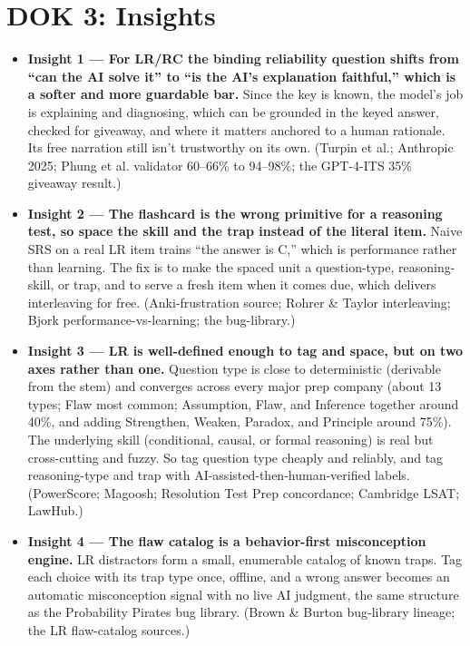 \documentclass[11pt]{article}
\begin{document}
\section*{DOK 3: Insights}

\begin{itemize}
\item \textbf{Insight 1 --- For LR/RC the binding reliability question shifts from \enquote{can the AI solve it} to \enquote{is the AI's explanation faithful,} which is a softer and more guardable bar.} Since the key is known, the model's job is explaining and diagnosing, which can be grounded in the keyed answer, checked for giveaway, and where it matters anchored to a human rationale. Its free narration still isn't trustworthy on its own. (Turpin et al.; Anthropic 2025; Phung et al. validator 60--66\% to 94--98\%; the GPT-4-ITS 35\% giveaway result.)
\item \textbf{Insight 2 --- The flashcard is the wrong primitive for a reasoning test, so space the skill and the trap instead of the literal item.} Naive SRS on a real LR item trains \enquote{the answer is C,} which is performance rather than learning. The fix is to make the spaced unit a question-type, reasoning-skill, or trap, and to serve a fresh item when it comes due, which delivers interleaving for free. (Anki-frustration source; Rohrer \& Taylor interleaving; Bjork performance-vs-learning; the bug-library.)
\item \textbf{Insight 3 --- LR is well-defined enough to tag and space, but on two axes rather than one.} Question type is close to deterministic (derivable from the stem) and converges across every major prep company (about 13 types; Flaw most common; Assumption, Flaw, and Inference together around 40\%, and adding Strengthen, Weaken, Paradox, and Principle around 75\%). The underlying skill (conditional, causal, or formal reasoning) is real but cross-cutting and fuzzy. So tag question type cheaply and reliably, and tag reasoning-type and trap with AI-assisted-then-human-verified labels. (PowerScore; Magoosh; Resolution Test Prep concordance; Cambridge LSAT; LawHub.)
\item \textbf{Insight 4 --- The flaw catalog is a behavior-first misconception engine.} LR distractors form a small, enumerable catalog of known traps. Tag each choice with its trap type once, offline, and a wrong answer becomes an automatic misconception signal with no live AI judgment, the same structure as the Probability Pirates bug library. (Brown \& Burton bug-library lineage; the LR flaw-catalog sources.)

\end{itemize}
\end{document}
